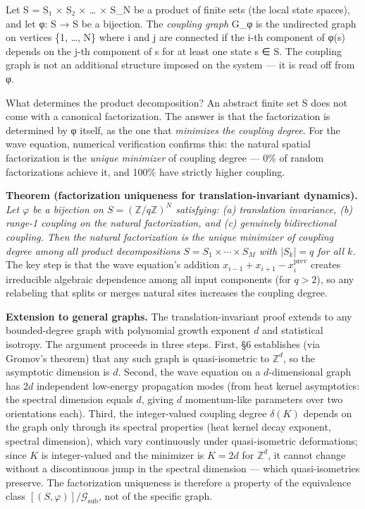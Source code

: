\documentclass[
  11pt,
]{article}
\begin{document}
Let S = S₁ × S₂ × \ldots{} × S\_N be a product of finite sets (the local
state spaces), and let φ: S → S be a bijection. The \emph{coupling
graph} G\_φ is the undirected graph on vertices \{1, \ldots, N\} where i
and j are connected if the i-th component of φ(s) depends on the j-th
component of s for at least one state s ∈ S. The coupling graph is not
an additional structure imposed on the system --- it is read off from φ.

What determines the product decomposition? An abstract finite set S does
not come with a canonical factorization. The answer is that the
factorization is determined by φ itself, as the one that \emph{minimizes
the coupling degree}. For the wave equation, numerical verification
confirms this: the natural spatial factorization is the \emph{unique
minimizer} of coupling degree --- 0\% of random factorizations achieve
it, and 100\% have strictly higher coupling.

\textbf{Theorem (factorization uniqueness for translation-invariant
dynamics).} \emph{Let \(\varphi\) be a bijection on
\(S = (\mathbb{Z}/q\mathbb{Z})^N\) satisfying: (a) translation
invariance, (b) range-1 coupling on the natural factorization, and (c)
genuinely bidirectional coupling. Then the natural factorization is the
unique minimizer of coupling degree among all product decompositions
\(S = S_1 \times \cdots \times S_M\) with \(|S_k| = q\) for all \(k\).}
The key step is that the wave equation's addition
\(x_{i-1} + x_{i+1} - x_i^{\text{prev}}\) creates irreducible algebraic
dependence among all input components (for \(q > 2\)), so any relabeling
that splits or merges natural sites increases the coupling degree.

\textbf{Extension to general graphs.} The translation-invariant proof
extends to any bounded-degree graph with polynomial growth exponent
\(d\) and statistical isotropy. The argument proceeds in three steps.
First, §6 establishes (via Gromov's theorem) that any such graph is
quasi-isometric to \(\mathbb{Z}^d\), so the asymptotic dimension is
\(d\). Second, the wave equation on a \(d\)-dimensional graph has \(2d\)
independent low-energy propagation modes (from heat kernel asymptotics:
the spectral dimension equals \(d\), giving \(d\) momentum-like
parameters over two orientations each). Third, the integer-valued
coupling degree \(\delta(K)\) depends on the graph only through its
spectral properties (heat kernel decay exponent, spectral dimension),
which vary continuously under quasi-isometric deformations; since \(K\)
is integer-valued and the minimizer is \(K = 2d\) for \(\mathbb{Z}^d\),
it cannot change without a discontinuous jump in the spectral dimension
--- which quasi-isometries preserve. The factorization uniqueness is
therefore a property of the equivalence class
\([(S, \varphi)]/\mathcal{G}_{\text{sub}}\), not of the specific graph.
\end{document}

